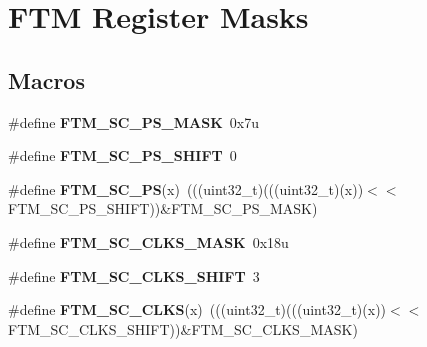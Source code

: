\hypertarget{group__FTM__Register__Masks}{}\section{F\+TM Register Masks}
\label{group__FTM__Register__Masks}
\subsection*{Macros}
\begin{DoxyCompactItemize}
\item 
\#define {\bfseries F\+T\+M\+\_\+\+S\+C\+\_\+\+P\+S\+\_\+\+M\+A\+SK}~0x7u\hypertarget{group__FTM__Register__Masks_ga6d12f2131f28899f9d18b8e7fe12349f}{}\label{group__FTM__Register__Masks_ga6d12f2131f28899f9d18b8e7fe12349f}

\item 
\#define {\bfseries F\+T\+M\+\_\+\+S\+C\+\_\+\+P\+S\+\_\+\+S\+H\+I\+FT}~0\hypertarget{group__FTM__Register__Masks_ga8c61fdf29e7bfcc3b61c9b3cc86019b6}{}\label{group__FTM__Register__Masks_ga8c61fdf29e7bfcc3b61c9b3cc86019b6}

\item 
\#define {\bfseries F\+T\+M\+\_\+\+S\+C\+\_\+\+PS}(x)~(((uint32\+\_\+t)(((uint32\+\_\+t)(x))$<$$<$F\+T\+M\+\_\+\+S\+C\+\_\+\+P\+S\+\_\+\+S\+H\+I\+FT))\&F\+T\+M\+\_\+\+S\+C\+\_\+\+P\+S\+\_\+\+M\+A\+SK)\hypertarget{group__FTM__Register__Masks_ga065038b692ab15f728ec344376d66c5b}{}\label{group__FTM__Register__Masks_ga065038b692ab15f728ec344376d66c5b}

\item 
\#define {\bfseries F\+T\+M\+\_\+\+S\+C\+\_\+\+C\+L\+K\+S\+\_\+\+M\+A\+SK}~0x18u\hypertarget{group__FTM__Register__Masks_ga4a0ff5e0b4f7181e51e0139abfa6d7d3}{}\label{group__FTM__Register__Masks_ga4a0ff5e0b4f7181e51e0139abfa6d7d3}

\item 
\#define {\bfseries F\+T\+M\+\_\+\+S\+C\+\_\+\+C\+L\+K\+S\+\_\+\+S\+H\+I\+FT}~3\hypertarget{group__FTM__Register__Masks_ga9c8973dcfd297dfda1f057c14e1deb4b}{}\label{group__FTM__Register__Masks_ga9c8973dcfd297dfda1f057c14e1deb4b}

\item 
\#define {\bfseries F\+T\+M\+\_\+\+S\+C\+\_\+\+C\+L\+KS}(x)~(((uint32\+\_\+t)(((uint32\+\_\+t)(x))$<$$<$F\+T\+M\+\_\+\+S\+C\+\_\+\+C\+L\+K\+S\+\_\+\+S\+H\+I\+FT))\&F\+T\+M\+\_\+\+S\+C\+\_\+\+C\+L\+K\+S\+\_\+\+M\+A\+SK)\hypertarget{group__FTM__Register__Masks_ga4c0b108bf05899c019de06f311cb5c89}{}\label{group__FTM__Register__Masks_ga4c0b108bf05899c019de06f311cb5c89}


\end{DoxyCompactItemize}
